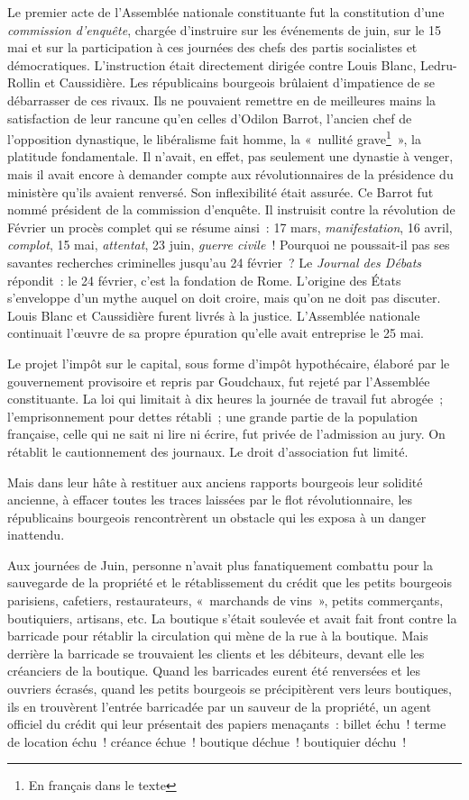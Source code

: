 \documentclass[twoside]{book} %
\begin{document}
Le premier acte de l’Assemblée nationale constituante fut la constitution d’une \emph{commission d’enquête}, chargée d’instruire sur les événements de juin, sur le 15 mai et sur la participation à ces journées des chefs des partis socialistes et démocratiques. L’instruction était directement dirigée contre Louis Blanc, Ledru-Rollin et Caussidière. Les républicains bourgeois brûlaient d’impatience de se débarrasser de ces rivaux. Ils ne pouvaient remettre en de meilleures mains la satisfaction de leur rancune qu’en celles d’Odilon Barrot, l’ancien chef de l’opposition dynastique, le libéralisme fait homme, la « nullité grave\footnote{En français dans le texte} », la platitude fondamentale. Il n’avait, en effet, pas seulement une dynastie à venger, mais il avait encore à demander compte aux révolutionnaires de la présidence du ministère qu’ils avaient renversé. Son inflexibilité était assurée. Ce Barrot fut nommé président de la commission d’enquête. Il instruisit contre la révolution de Février un procès complet qui se résume ainsi : 17 mars, \emph{manifestation}, 16 avril, \emph{complot}, 15 mai, \emph{attentat}, 23 juin, \emph{guerre civile} ! Pourquoi ne poussait-il pas ses savantes recherches criminelles jusqu’au 24 février ? Le \emph{Journal des Débats} répondit : le 24 février, c’est la fondation de Rome. L’origine des États s’enveloppe d’un mythe auquel on doit croire, mais qu’on ne doit pas discuter. Louis Blanc et Caussidière furent livrés à la justice. L’Assemblée nationale continuait l’œuvre de sa propre épuration qu’elle avait entreprise le 25 mai.\par
Le projet l’impôt sur le capital, sous forme d’impôt hypothécaire, élaboré par le gouvernement provisoire et repris par Goudchaux, fut rejeté par l’Assemblée constituante. La loi qui limitait à dix heures la journée de travail fut abrogée ; l’emprisonnement pour dettes rétabli ; une grande partie de la population française, celle qui ne sait ni lire ni écrire, fut privée de l’admission au jury. On rétablit le cautionnement des journaux. Le droit d’association fut limité.\par
Mais dans leur hâte à restituer aux anciens rapports bourgeois leur solidité ancienne, à effacer toutes les traces laissées par le flot révolutionnaire, les républicains bourgeois rencontrèrent un obstacle qui les exposa à un danger inattendu.\par
Aux journées de Juin, personne n’avait plus fanatiquement combattu pour la sauvegarde de la propriété et le rétablissement du crédit que les petits bourgeois parisiens, cafetiers, restaurateurs, « marchands de vins », petits commerçants, boutiquiers, artisans, etc. La boutique s’était soulevée et avait fait front contre la barricade pour rétablir la circulation qui mène de la rue à la boutique. Mais derrière la barricade se trouvaient les clients et les débiteurs, devant elle les créanciers de la boutique. Quand les barricades eurent été renversées et les ouvriers écrasés, quand les petits bourgeois se précipitèrent vers leurs boutiques, ils en trouvèrent l’entrée barricadée par un sauveur de la propriété, un agent officiel du crédit qui leur présentait des papiers menaçants : billet échu ! terme de location échu ! créance échue ! boutique déchue ! boutiquier déchu !\par
\end{document}
